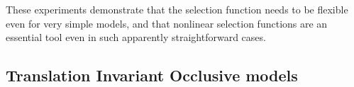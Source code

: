 
These experiments demonstrate that the selection function needs to be flexible even
for very simple models, and that nonlinear selection functions are an essential tool
even in such apparently straightforward cases.





%


\subsection{Translation Invariant Occlusive models}
\label{invec}


